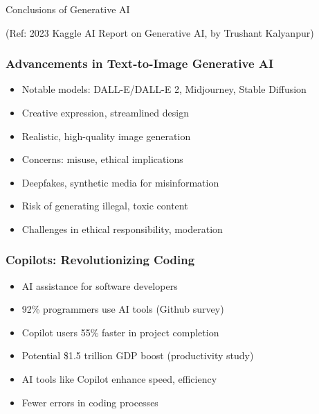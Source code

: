 \begin{frame}[fragile]\frametitle{}
\begin{center}
{\Large Conclusions of Generative AI}
\end{center}

{\tiny (Ref: 2023 Kaggle AI Report on Generative AI, by Trushant Kalyanpur)}

\end{frame}

\begin{frame}[fragile]\frametitle{Advancements in Text-to-Image Generative AI}
    \begin{itemize}
        \item Notable models: DALL-E/DALL-E 2, Midjourney, Stable Diffusion
        \item Creative expression, streamlined design
        \item Realistic, high-quality image generation
        \item Concerns: misuse, ethical implications
        \item Deepfakes, synthetic media for misinformation
        \item Risk of generating illegal, toxic content
        \item Challenges in ethical responsibility, moderation
    \end{itemize}
\end{frame}

\begin{frame}[fragile]\frametitle{Copilots: Revolutionizing Coding}
    \begin{itemize}
        \item AI assistance for software developers
        \item 92\% programmers use AI tools (Github survey)
        \item Copilot users 55\% faster in project completion
        \item Potential \$1.5 trillion GDP boost (productivity study)
        \item AI tools like Copilot enhance speed, efficiency
        \item Fewer errors in coding processes
    \end{itemize}
\end{frame}

